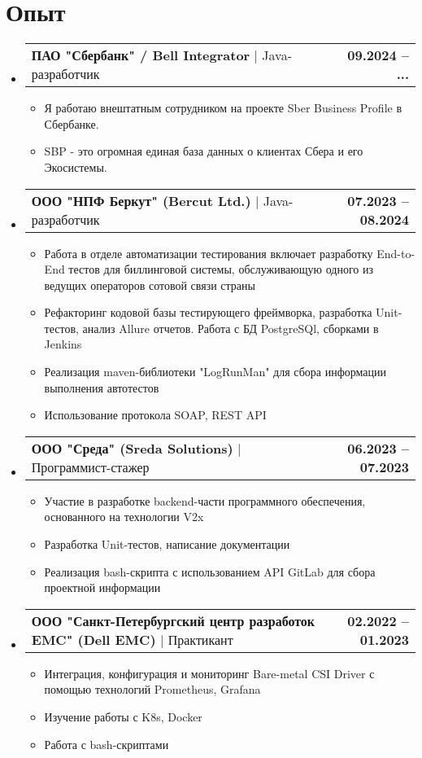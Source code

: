 \documentclass[a4paper,9pt]{report}
\makeatletter
\newcommand{\lineSeparatedText}[2]{
        {\textbf{\normalsize{{#1}}}} $|$ {\large{#2}}
}
\newcommand{\resumeExpItem}[2] {
    \item
    \begin{tabular*}{1.001\textwidth}{l@{\extracolsep{\fill}}r}
        #1 & \textbf{\small#2}
    \end{tabular*}\vspace{-5pt}
}
\newcommand{\resumeSubHeadingListStart}{\begin{itemize}[leftmargin=0.0in, label={}]}
\newcommand{\resumeSubHeadingListEnd}{\end{itemize}}
\newcommand{\resumeItemListStart}{\begin{itemize}}
\newcommand{\resumeItemListEnd}{\end{itemize}\vspace{-5pt}}
\newcommand{\bulletItem}[1]{\item[$\bullet$] #1}
\makeatother
\begin{document}
\section{Опыт}
\resumeSubHeadingListStart

\resumeExpItem {\lineSeparatedText{ПАО "Сбербанк" / Bell Integrator}{Java-разработчик}}{09.2024 -- ...}
\resumeItemListStart
\bulletItem{Я работаю внештатным сотрудником на проекте Sber Business Profile в Сбербанке.}
\bulletItem{SBP - это огромная единая база данных о клиентах Сбера и его Экосистемы.}
\resumeItemListEnd

\resumeExpItem {\lineSeparatedText{ООО "НПФ Беркут" (Bercut Ltd.)}{Java-разработчик}}{07.2023 -- 08.2024}
\resumeItemListStart
\bulletItem{Работа в отделе автоматизации тестирования включает разработку End-to-End тестов для биллинговой системы, обслуживающую одного из ведущих операторов сотовой связи страны}
\bulletItem{Рефакторинг кодовой базы тестирующего фреймворка, разработка Unit-тестов, анализ Allure отчетов. Работа с БД PostgreSQl, сборками в Jenkins}
\bulletItem{Реализация maven-библиотеки "LogRunMan" для сбора информации выполнения автотестов}
\bulletItem{Использование протокола SOAP, REST API}
\resumeItemListEnd

\resumeExpItem {\lineSeparatedText{ООО "Среда" (Sreda Solutions)}{Программист-стажер}}{06.2023 -- 07.2023}
\resumeItemListStart
\bulletItem{Участие в разработке backend-части программного обеспечения, основанного на технологии V2x}
\bulletItem{Разработка Unit-тестов, написание документации}
\bulletItem{Реализация bash-скрипта с использованием API GitLab для сбора проектной информации}
\resumeItemListEnd

\resumeExpItem {\lineSeparatedText{ООО "Санкт-Петербургский центр разработок EMC" (Dell EMC)}{Практикант}}{02.2022 -- 01.2023}
\resumeItemListStart
\bulletItem{Интеграция, конфигурация и мониторинг Bare-metal CSI Driver с помощью технологий Prometheus, Grafana}
\bulletItem{Изучение работы с K8s, Docker}
\bulletItem{Работа с bash-скриптами}
\resumeItemListEnd


\resumeSubHeadingListEnd
\end{document}

